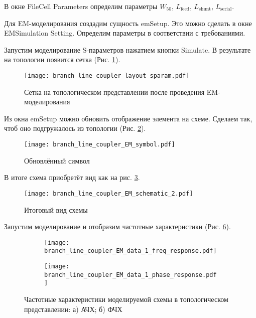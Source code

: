 В окне File\textrightarrow Cell Parameters определим параметры $W_{50}$, $L_\text{feed}$, $L_\text{shunt}$, $L_\text{serial}$.

Для EM-моделирования создадим сущность emSetup.
Это можно сделать в окне EM\textrightarrow Simulation Setting.
Определим параметры в соответствии с требованиями.

Запустим моделирование S-параметров нажатием кнопки Simulate.
В результате на топологии появится сетка (Рис. \ref{fig:branch_line_coupler_layout_sparam}).

\begin{figure}
    \centering
    \texttt{[image: branch\_line\_coupler\_layout\_sparam.pdf]}
    \caption{Сетка на топологическом представлении после проведения EM-моделирования}
    \label{fig:branch_line_coupler_layout_sparam}
\end{figure}

Из окна emSetup можно обновить отображение элемента на схеме.
Сделаем так, чтоб оно подгружалось из топологии (Рис. \ref{fig:branch_line_coupler_EM_symbol}).
\begin{figure}
    \centering
    \texttt{[image: branch\_line\_coupler\_EM\_symbol.pdf]}
    \caption{Обновлённый символ}
    \label{fig:branch_line_coupler_EM_symbol}
\end{figure}
В итоге схема приобретёт вид как на рис. \ref{fig:branch_line_coupler_EM_schematic_2}.
\begin{figure}
    \centering
    \texttt{[image: branch\_line\_coupler\_EM\_schematic\_2.pdf]}
    \caption{Итоговый вид схемы}
    \label{fig:branch_line_coupler_EM_schematic_2}
\end{figure}

Запустим моделирование и отобразим частотные характеристики (Рис. \ref{fig:branch_line_coupler_EM_data_1}).

\begin{figure}[!ht]
    \centering
    \begin{subfigure}[b]{0.45\textwidth}
        \centering
        \texttt{[image: branch\_line\_coupler\_EM\_data\_1\_freq\_response.pdf]}
        \caption{}
        \label{fig:branch_line_coupler_EM_data_1_freq_response}
    \end{subfigure}
    \hfill
    \begin{subfigure}[b]{0.45\textwidth}
        \centering
        \texttt{[image: branch\_line\_coupler\_EM\_data\_1\_phase\_response.pdf]}
        \caption{}
        \label{fig:branch_line_coupler_EM_data_1_phase_response}
    \end{subfigure}
    \caption{
        Частотные характеристики моделируемой схемы в топологическом представлении:
        а) АЧХ;
        б) ФЧХ
    }
    \label{fig:branch_line_coupler_EM_data_1}
\end{figure}

